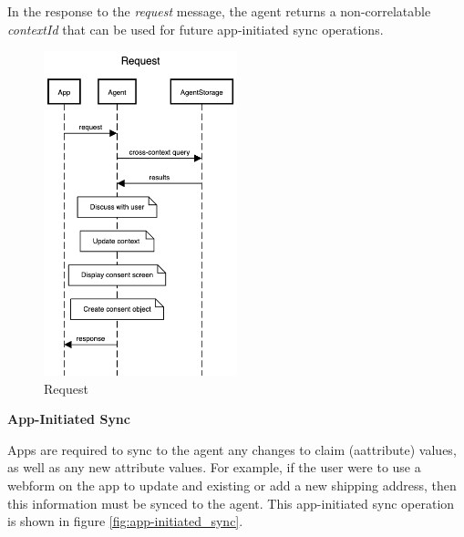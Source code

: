 \documentclass[11pt, oneside]{article}   	%
\begin{document}
In the response to the \emph{request} message, the agent returns a non-correlatable \emph{contextId} that can be used for future app-initiated sync operations.

\begin{figure}[htbp]
	\centering
	\includegraphics[width=0.50\textwidth]{./images/int-request.png}
	\caption{Request}
	\label{fig:request}
\end{figure}

\textbf{App-Initiated Sync}

Apps are required to sync to the agent any changes to claim (aattribute) values, as well as any new attribute values. For example, if the user were to use a webform on the app to update and existing or add a new shipping address, then this information must be synced to the agent. This app-initiated sync operation is shown in figure \ref{fig:app-initiated_sync}.

\end{document}
